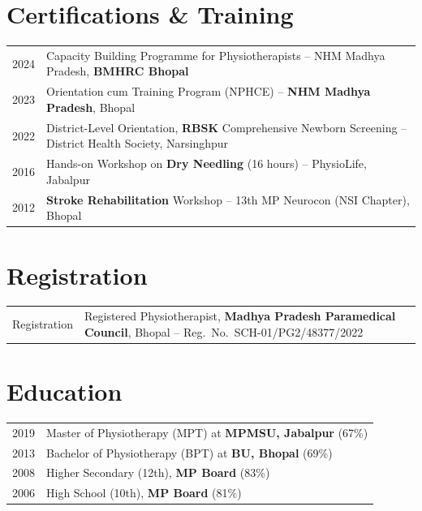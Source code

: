 \documentclass[a4paper,10pt]{article}
\newcommand{\customHeading}[1]{
    \section{\texorpdfstring{#1 \hrulefill}{}}
}
\begin{document}
\customHeading{Certifications \& Training}
\begin{tabularx}{\linewidth}{@{}l X@{}}
2024 & Capacity Building Programme for Physiotherapists -- NHM Madhya Pradesh, \textbf{BMHRC Bhopal} \\[1.5pt]

2023 & Orientation cum Training Program (NPHCE) -- \textbf{NHM Madhya Pradesh}, Bhopal \\[1.5pt]

2022 & District-Level Orientation, \textbf{RBSK} Comprehensive Newborn Screening -- District Health Society, Narsinghpur \\[1.5pt]

2016 & Hands-on Workshop on \textbf{Dry Needling} (16 hours) -- PhysioLife, Jabalpur \\[1.5pt]

2012 & \textbf{Stroke Rehabilitation} Workshop -- 13th MP Neurocon (NSI Chapter), Bhopal \\
\end{tabularx}


\customHeading{Registration}
\begin{tabularx}{\linewidth}{@{}l >{\raggedright\arraybackslash}X@{}}
Registration &  \normalsize{Registered Physiotherapist, \textbf{Madhya Pradesh Paramedical Council}, Bhopal -- Reg.~No.~\mbox{SCH-01/PG2/48377/2022}}\\
\end{tabularx}


\customHeading{Education}
\begin{tabularx}{\linewidth}{@{}l X@{}}
2019 & Master of Physiotherapy (MPT) at \textbf{MPMSU, Jabalpur} \hfill \normalsize (67\%) \\[1.5pt]

2013 & Bachelor of Physiotherapy (BPT) at \textbf{BU, Bhopal} \hfill \normalsize (69\%) \\[1.5pt]

2008 & Higher Secondary (12th), \textbf{MP Board} \hfill \normalsize (83\%) \\[1.5pt]

2006 & High School (10th), \textbf{MP Board} \hfill \normalsize (81\%) \\
\end{tabularx}
\end{document}

